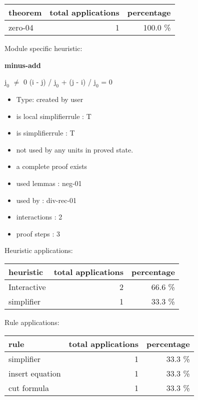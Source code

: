 \documentclass[a4paper]{article}
\begin{document}
\begin{supertabular}{l|r|r}
theorem	        & total applications & percentage \\ \hline
zero-04 & 1 & 100.0 \% \\

\end{supertabular}

Module specific heuristic:

\pagebreak

{\LARGE\bf minus-add}\label{lemma-minus-add}

\medskip

$\mbox{j}_{0}$ $\neq$ 0 \Fol (i - j) / $\mbox{j}_{0}$ + (j - i) / $\mbox{j}_{0}$ = 0

\begin{itemize}

\item Type: created by user

\item is local simplifierrule : T
\item is simplifierrule : T
\item not used by any units in proved state.
\item       a complete proof exists
\item       used lemmas  : neg-01
\item       used by      : div-rec-01
\item       interactions : 2
\item       proof steps  : 3
\end{itemize}

\medskip


Heuristic applications:

\begin{supertabular}{l|r|r}
heuristic	& total applications & percentage \\ \hline
Interactive & 2 & 66.6 \% \\
simplifier & 1 & 33.3 \% \\

\end{supertabular}

Rule applications:

\begin{supertabular}{l|r|r}
rule	        & total applications & percentage \\ \hline
simplifier & 1 & 33.3 \% \\
insert equation & 1 & 33.3 \% \\
cut formula & 1 & 33.3 \% \\

\end{supertabular}
\end{document}
